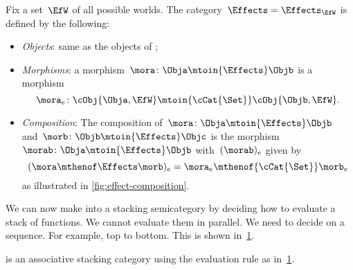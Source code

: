 \begin{definition}
    Fix a set~$\EfW$ of all possible worlds.
    The category~$\Effects=  \Effects_\EfW$ is defined by the following:
    \begin{itemize}
        \item \emph{Objects}: same as the objects of \SetL;
        \item \emph{Morphisms}: a morphism~$\mora\colon \Obja \mtoin{\Effects} \Objb$ is a morphism
              \begin{equation}
                  \mora_e\colon \cObj{\Obja, \EfW} \mtoin{\cCat{\Set}} \cObj{\Objb, \EfW}.
              \end{equation}
        \item \emph{Composition}: The composition of~$\mora\colon \Obja \mtoin{\Effects} \Objb$ and~$\morb\colon \Objb \mtoin{\Effects} \Objc$ is the morphism~$\morab\colon \Obja \mtoin{\Effects} \Objb$ with~$(\morab)_e$ given by
              \begin{equation}
                  (\mora \mthenof \Effects \morb)
                  _e = \mora_e \mthenof{\cCat{\Set}} \morb_e
              \end{equation}
              as illustrated in \cref{fig:effect-composition}.
    \end{itemize}
\end{definition}

We can now make \Effects into a stacking semicategory by deciding how to evaluate a stack of functions.
We cannot evaluate them in parallel.
We need to decide on a sequence.
For example, top to bottom.
This is shown in~\cref{fig:effect-stacking}.

\begin{lemma}
    \label{lem:effects-is-stacking}
    \Effects is an associative stacking category using the evaluation rule as in~\cref{fig:effect-stacking}.
\end{lemma}

\begin{figure}[h!]
    \centering
    \caption{}
    \label{fig:effect-stacking}
\end{figure}


